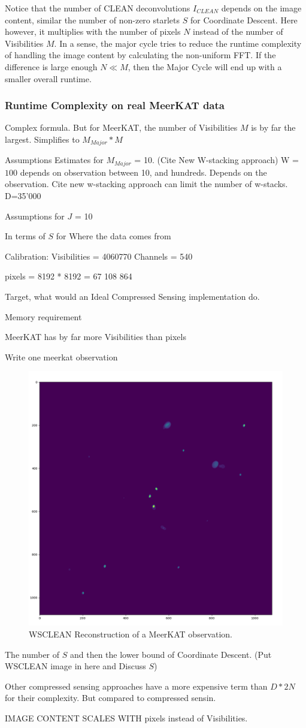 Notice that the number of CLEAN deconvolutions $I_{CLEAN}$ depends on the image content, similar the number of non-zero starlets $S$ for Coordinate Descent. Here however, it multiplies with the number of pixels $N$ instead of the number of Visibilities $M$. In a sense, the major cycle tries to reduce the runtime complexity of handling the image content by calculating the non-uniform FFT. If the difference is large enough $N \ll M$, then the Major Cycle will end up with a smaller overall runtime.

\subsubsection{Runtime Complexity on real MeerKAT data}


Complex formula. But for MeerKAT, the number of Visibilities $M$ is by far the largest. Simplifies to $M_{Major}*M$

Assumptions
Estimates for $M_{Major}$ = 10. (Cite New W-stacking approach)
W = $100$ depends on observation between 10, and hundreds. Depends on the observation. Cite new w-stacking approach can limit the number of w-stacks. 
D=35'000

Assumptions for $J$ = 10


In terms of $S$ for 
Where the data comes from

Calibration: 
Visibilities = 4060770
Channels = 540

pixels = 8192 * 8192 = 67 108 864

Target, what would an Ideal Compressed Sensing implementation do.

Memory requirement

MeerKAT has by far more Visibilities than pixels

Write one meerkat observation

\begin{figure}[h]
	\centering
	\includegraphics[width=0.5\linewidth]{./chapters/05.algorithms/sim00/full_cache_debug.png}
	\caption{WSCLEAN Reconstruction of a MeerKAT observation.}
	\label{results:wsclean}
\end{figure}
The number of $S$ and then the lower bound of Coordinate Descent. (Put WSCLEAN image in here and Discuss $S$)



Other compressed sensing approaches have a more expensive term than $D*2N$ for their complexity. But compared to compressed sensin.


IMAGE CONTENT SCALES WITH pixels instead of Visibilities.

